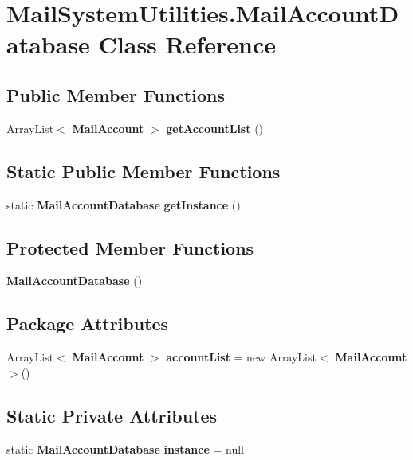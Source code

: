 \section{Mail\+System\+Utilities.\+Mail\+Account\+Database Class Reference}
\label{class_mail_system_utilities_1_1_mail_account_database}
\subsection*{Public Member Functions}
\begin{DoxyCompactItemize}
\item 
Array\+List$<$ \textbf{ Mail\+Account} $>$ \textbf{ get\+Account\+List} ()
\end{DoxyCompactItemize}
\subsection*{Static Public Member Functions}
\begin{DoxyCompactItemize}
\item 
static \textbf{ Mail\+Account\+Database} \textbf{ get\+Instance} ()
\end{DoxyCompactItemize}
\subsection*{Protected Member Functions}
\begin{DoxyCompactItemize}
\item 
\textbf{ Mail\+Account\+Database} ()
\end{DoxyCompactItemize}
\subsection*{Package Attributes}
\begin{DoxyCompactItemize}
\item 
Array\+List$<$ \textbf{ Mail\+Account} $>$ \textbf{ account\+List} = new Array\+List$<$\textbf{ Mail\+Account}$>$()
\end{DoxyCompactItemize}
\subsection*{Static Private Attributes}
\begin{DoxyCompactItemize}
\item 
static \textbf{ Mail\+Account\+Database} \textbf{ instance} = null
\end{DoxyCompactItemize}


